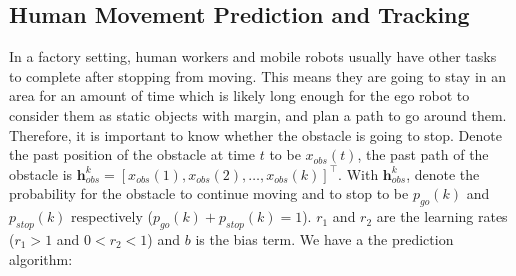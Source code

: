 \documentclass[letterpaper, 10 pt, conference]{ieeeconf}  %
\begin{document}

\subsection{Human Movement Prediction and Tracking}
In a factory setting, human workers and mobile robots usually have other tasks to complete after stopping from moving. This means they are going to stay in an area for an amount of time which is likely long enough for the ego robot to consider them as static objects with margin, and plan a path to go around them. Therefore, it is important to know whether the obstacle is going to stop. Denote the past position of the obstacle at time $t$ to be $x_{obs}(t)$, the past path of the obstacle is $\mathbf{h}_{obs}^k = [x_{obs}(1), x_{obs}(2),\ldots, x_{obs}(k)]^\top$. With $\mathbf{h}_{obs}^k$, denote the probability for the obstacle to continue moving and to stop to be $p_{go}(k)$ and $p_{stop}(k)$ respectively ($p_{go}(k)+p_{stop}(k)=1$). $r_1$ and $r_2$ are the learning rates ($r_1 >1 $ and $0<r_2<1$) and $b$ is the bias term. We have a the prediction algorithm: 
\end{document}

